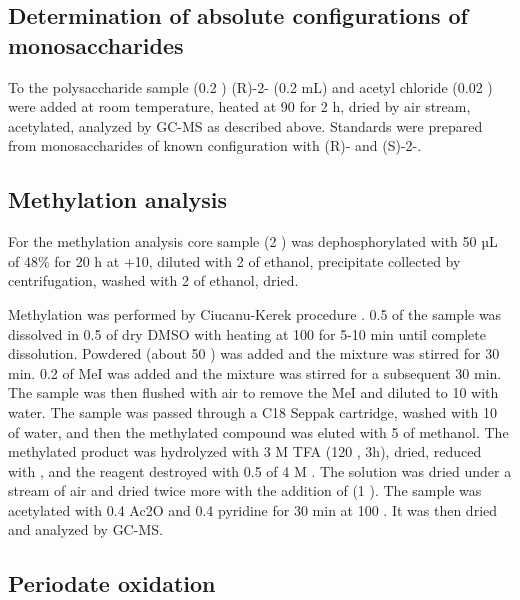	\subsection{Determination of absolute configurations of monosaccharides} %
	\label{sub:determination_of_absolute_configurations_of_monosaccharides}

		To the polysaccharide sample (0.2 \milligram) (R)-2- (0.2 mL) and acetyl chloride (0.02 \millilitre) were added at room temperature, heated at 90 \cel for 2 h, dried by air stream, acetylated, analyzed by \ac{GC-MS} as described above. Standards were prepared from monosaccharides of known configuration with (R)- and (S)-2-.

	\subsection{Methylation analysis} %
	\label{sub:methylation_analysis}

		For the methylation analysis core sample (2 \milligram) was dephosphorylated with 50 µL of 48\%  for 20 h at +10\cel, diluted with 2 \millilitre of ethanol, precipitate collected by centrifugation, washed with 2 \millilitre of ethanol, dried.

		Methylation was performed by Ciucanu-Kerek procedure . 0.5 \milligram of the sample was dissolved in 0.5 \millilitre of dry DMSO with heating at 100 \cel for 5-10 min until complete dissolution. Powdered  (about 50 \milligram) was added and the mixture was stirred for 30 min. 0.2 \millilitre of MeI was added and the mixture was stirred for a subsequent 30 min. The sample was then flushed with air to remove the MeI and diluted to 10 \millilitre with water. The sample was passed through a C18 Seppak cartridge, washed with 10 \millilitre of water, and then the methylated compound was eluted with 5 \millilitre of methanol. The methylated product was hydrolyzed with 3 M TFA (120 \cel, 3h), dried, reduced with , and the reagent destroyed with 0.5 \millilitre of 4 M . The solution was dried under a stream of air and dried twice more with the addition of  (1 \millilitre). The sample was acetylated with 0.4 \millilitre Ac2O and 0.4 \millilitre pyridine for 30 min at 100 \cel. It was then dried and analyzed by \ac{GC-MS}.

	\subsection{Periodate oxidation} %
	\label{sub:periodate_oxidation}

